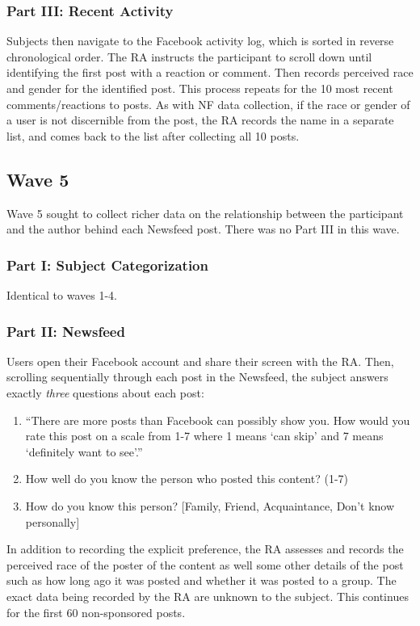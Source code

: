 \documentclass[12pt,letterpaper]{article}
\begin{document}
\subsubsection{Part III: Recent Activity} Subjects then navigate to the Facebook activity log, which is sorted in reverse chronological order. The RA instructs the participant to scroll down until identifying the first post with a reaction or comment. Then records perceived race and gender for the identified post. This process repeats for the 10 most recent comments/reactions to posts. As with NF data collection, if the race or gender of a user is not discernible from the post, the RA records the name in a separate list, and comes back to the list after collecting all 10 posts.

\subsection{Wave 5}

Wave 5 sought to collect richer data on the relationship between the participant and the author behind each Newsfeed post. There was no Part III in this wave.

\subsubsection{Part I: Subject Categorization} Identical to waves 1-4.

\subsubsection{Part II: Newsfeed} Users open their Facebook account and share their screen with the RA. Then, scrolling sequentially through each post in the Newsfeed, the subject answers exactly \textit{three} questions about each post: 
\begin{enumerate}
    \item “There are more posts than Facebook can possibly show you. How would you rate this post on a scale from 1-7 where 1 means ‘can skip’ and 7 means ‘definitely want to see’.” 
    \item How well do you know the person who posted this content? (1-7)
    \item How do you know this person? [Family, Friend, Acquaintance, Don’t know personally]
\end{enumerate}

In addition to recording the explicit preference, the RA assesses and records the perceived race of the poster of the content as well some other details of the post such as how long ago it was posted and whether it was posted to a group. The exact data being recorded by the RA are unknown to the subject. This continues for the first 60 non-sponsored posts.
\end{document}
